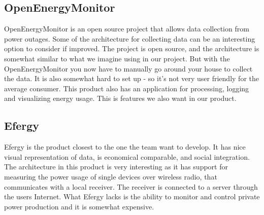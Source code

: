 \subsection{OpenEnergyMonitor}

OpenEnergyMonitor\cite{openenergymonitor} is an open source project that allows data collection from power outages. Some of the architecture for collecting data can be an interesting option to consider if improved. The project is open source, and the architecture is somewhat similar to what we imagine using in our project. But with the OpenEnergyMonitor you now have to manually go around your house to collect the data. It is also somewhat hard to set up - so it’s not very user friendly for the average consumer.  This product also has an application for processing, logging and visualizing energy usage. This is features we also want in our product. 



\subsection{Efergy}

Efergy\cite{efergy} is the product closest to the one the team want to develop. It has nice visual representation of data, is economical comparable, and social integration. The architecture in this product is very interesting as it has support for measuring the power usage of single devices over wireless radio, that communicates with a local receiver. The receiver is connected to a server through the users Internet. What Efergy lacks is the ability to monitor and control private power production and it is somewhat expensive.



